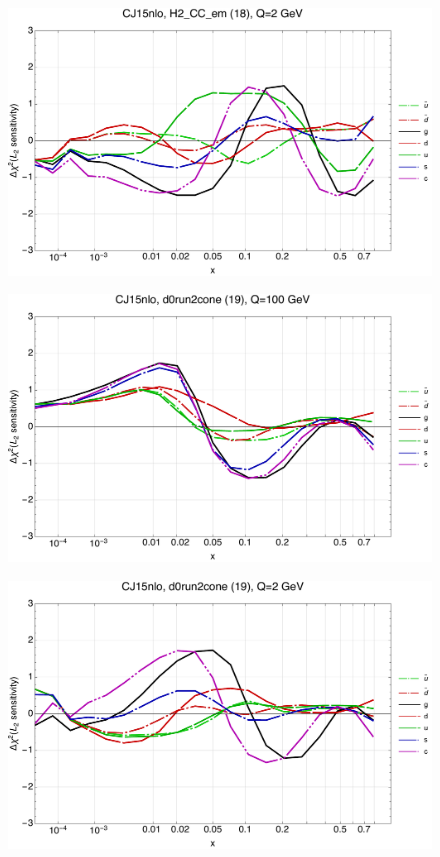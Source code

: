 \documentclass[10pt,aps,prd,floatfix,titlepage]{revtex4}
\begin{document}
\begin{figure}
\includegraphics[width=\textwidth,height=0.44\textheight,keepaspectratio]{1/18_CJ15nlo_L2_q2_Sf_1.pdf}
\caption{}
\end{figure}
\clearpage
\begin{figure}
\includegraphics[width=\textwidth,height=0.44\textheight,keepaspectratio]{1/19_CJ15nlo_L2_q100_Sf_1.pdf}
\caption{}
\end{figure}
\begin{figure}
\includegraphics[width=\textwidth,height=0.44\textheight,keepaspectratio]{1/19_CJ15nlo_L2_q2_Sf_1.pdf}
\caption{}
\end{figure}
\end{document}
